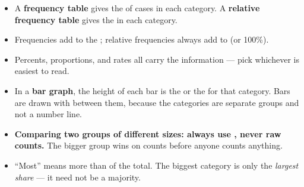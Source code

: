 \boxguard[14]
\begin{tcolorbox}[enhanced, colback=sky, colframe=navy, boxrule=0.8pt, arc=2mm,
    left=3mm, right=3mm, top=1.5mm, bottom=1.5mm, breakable,
    fonttitle=\bfseries\small\color{white}, title={QuickNotes: Tables and Graphs for a Categorical Variable},
    attach boxed title to top left={yshift=-2mm, xshift=4mm},
    boxed title style={colback=navy, colframe=navy, arc=1.5mm}]
\small
\begin{itemize}[leftmargin=1.1em, itemsep=4pt]
  \item A \textbf{frequency table} gives the  of cases in each category. A
        \textbf{relative frequency table} gives the  in each category.
  \item Frequencies add to the ; relative frequencies always add to
         (or 100\%).
  \item Percents, proportions, and rates all carry the  information --- pick
        whichever is easiest to read.
  \item In a \textbf{bar graph}, the height of each bar is the  or the
         for that category. Bars are drawn with  between them,
        because the categories are separate groups and not a number line.
  \item \textbf{Comparing two groups of different sizes: always use , never raw
        counts.} The bigger group wins on counts before anyone counts anything.
  \item ``Most'' means more than  of the total. The biggest category is only the
        \emph{largest share} --- it need not be a majority.
\end{itemize}
\end{tcolorbox}

